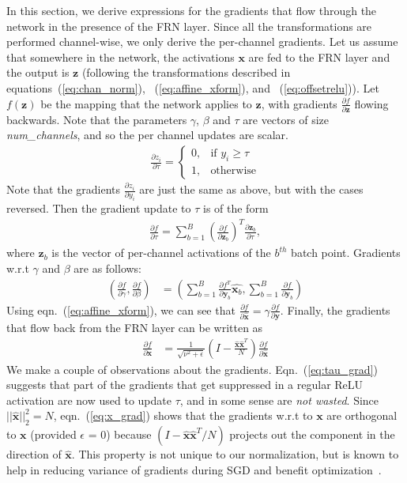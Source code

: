 \documentclass[10pt,twocolumn,letterpaper]{article}
\newcommand{\papername}{FRN}
\begin{document}
In this section, we derive expressions for the gradients that flow through the network in the presence of the \papername{} layer. Since all the transformations are performed channel-wise, we only derive the per-channel gradients. Let us assume that somewhere in the network, the activations $\bm{x}$ are fed to the \papername{} layer and the output is $\bm{z}$ (following the transformations described in equations~(\ref{eq:chan_norm}), ~(\ref{eq:affine_xform}), and ~(\ref{eq:offsetrelu})). Let $f(\bm{z})$ be the mapping that the network applies to $\bm{z}$, with gradients $\frac{\partial f}{\partial \bm z}$ flowing backwards. Note that the parameters $\gamma$, $\beta$ and $\tau$ are vectors of size \emph{num\_channels}, and so the per channel updates are scalar.
\begin{align}
\label{eq:orelu_grad}
\frac{\partial z_i}{\partial \tau} = 
\begin{cases}
0,& \text{if } y_i \geq \tau \\
1,& \text{otherwise}
\end{cases}
\end{align}
Note that the gradients $\frac{\partial z_i}{\partial y_i}$ are just the same as above, but with the cases reversed. Then the gradient update to $\tau$ is of the form
\begin{align}
\label{eq:tau_grad}
\frac{\partial f}{\partial \tau} = \sum_{b=1}^B \left( \frac{\partial f}{\partial \bm{z}_b} \right)^T \frac{\partial \bm{z}_b}{\partial \tau},
\end{align}
where $\bm{z}_b$ is the vector of per-channel activations of the $b^{th}$ batch point. Gradients w.r.t $\gamma$ and $\beta$ are as follows:
\begin{align}
\label{eq:gamma_beta_grad}
\left( \frac{\partial f}{\partial \gamma}, \frac{\partial f}{\partial \beta} \right) &= \left( \sum_{b=1}^B \frac{\partial f^T}{\partial \bm{y}_b} \hat{\bm{x}_b}, \sum_{b=1}^B \frac{\partial f}{\partial \bm{y}_b} \right)
\end{align}
Using eqn.~(\ref{eq:affine_xform}), we can see that $\frac{\partial f}{\partial \hat{\bm{x}}}{=}\gamma \frac{\partial f}{\partial \bm{y}}$. Finally, the gradients that flow back from the \papername{} layer can be written as
\begin{align}
\label{eq:x_grad}
\frac{\partial f}{\partial \bm{x}} &= \frac{1}{\sqrt{\nu^2 + \epsilon}} \left( I - \frac{\hat{\bm{x}} \hat{\bm{x}}^T}{N} \right) \frac{\partial f}{\partial \hat{\bm{x}}}
\end{align}
We make a couple of observations about the gradients. Eqn.~(\ref{eq:tau_grad}) suggests that part of the gradients that get suppressed in a regular ReLU activation are now used to update $\tau$, and in some sense are \emph{not wasted}. Since $||\hat{\bm{x}}||_2^2 = N$,  eqn.~(\ref{eq:x_grad}) shows that the gradients w.r.t to $\bm{x}$ are orthogonal to $\bm{x}$ (provided $\epsilon$ = 0) because $(I - \hat{\bm{x}} \hat{\bm{x}}^T/N)$ projects out the component in the direction of $\hat{\bm{x}}$. This property is not unique to our normalization, but is known to help in reducing variance of gradients during SGD and benefit optimization~\cite{salimans2016weight}.
\end{document}
